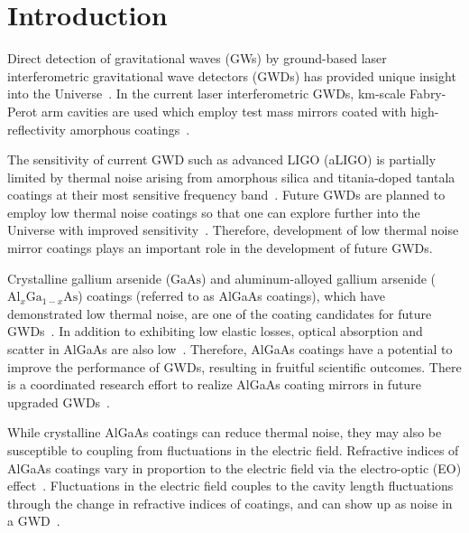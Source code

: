 \documentclass[%
 reprint,
 superscriptaddress,
 amsmath,amssymb,
 aps,
]{revtex4-2}
\begin{document}
\maketitle

\section{Introduction}

Direct detection of gravitational waves (GWs) by ground-based laser interferometric gravitational wave detectors (GWDs) has provided unique insight into the Universe~\cite{Abbott2016, Abbott2017, Abbott2021}.
In the current laser interferometric GWDs, km-scale Fabry-Perot arm cavities are used which employ test mass mirrors coated with high-reflectivity amorphous coatings~\cite{Degallaix2019,Granata2020}.

The sensitivity of current GWD such as advanced LIGO (aLIGO) is partially limited by thermal noise arising from amorphous silica and titania-doped tantala coatings at their most sensitive frequency band~\cite{Harry2006, Gras2018}.
Future GWDs are planned to employ low thermal noise coatings so that one can explore further into the Universe with improved sensitivity~\cite{Punturo_2010, Adhikari2020, CEHS, Srivastava2022}.
Therefore, development of low thermal noise mirror coatings plays an important role in the development of future GWDs.

Crystalline gallium arsenide ($\mathrm{GaAs}$) and aluminum-alloyed gallium arsenide ($\mathrm{Al}_{x}\mathrm{Ga}_{1-x}\mathrm{As}$) coatings (referred to as AlGaAs coatings), which have demonstrated low thermal noise, are one of the coating candidates for future GWDs~\cite{Cole2013, Penn2019}.
In addition to exhibiting low elastic losses, optical absorption and scatter in AlGaAs are also low~\cite{Cole2016, Winkler2021}.
Therefore, AlGaAs coatings have a potential to improve the performance of GWDs, resulting in fruitful scientific outcomes.
There is a coordinated research effort to realize AlGaAs coating mirrors in future upgraded GWDs~\cite{Chalermsongsak2016, Marchio2018, Koch2019}.

While crystalline AlGaAs coatings can reduce thermal noise, they may also be susceptible to coupling from fluctuations in the electric field.
Refractive indices of AlGaAs coatings vary in proportion to the electric field via the electro-optic (EO) effect~\cite{Namba1961, yariv}.
Fluctuations in the electric field couples to the cavity length fluctuations through the change in refractive indices of coatings, and can show up as noise in a GWD~\cite{Abernathy, Marty}.
\end{document}

